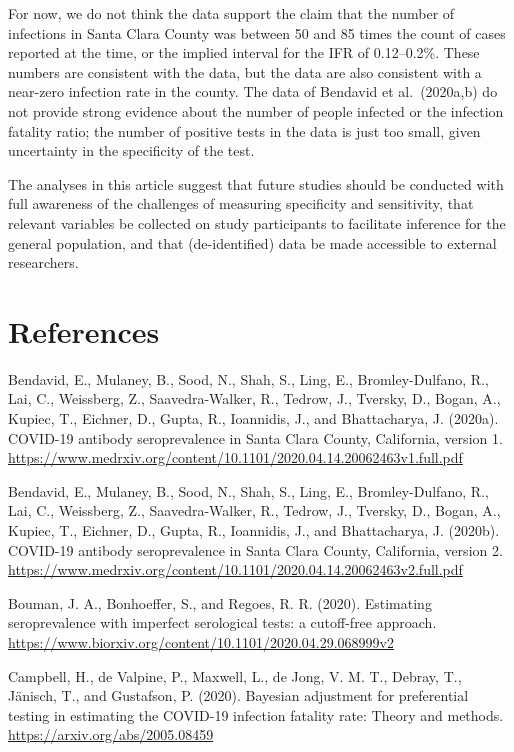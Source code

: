\documentclass[11pt]{article}
\begin{document}
For now, we do not think the data support the claim that the number of infections in Santa Clara County was between  50 and 85 times the count of cases reported at the time, or the implied interval for the IFR of 0.12--0.2\%.  These numbers are consistent with the data, but the data are also consistent with a near-zero infection rate in the county.  The data of Bendavid et al.\ (2020a,b) do not provide strong evidence about the number of people infected or the infection fatality ratio; the number of positive tests in the data is just too small, given uncertainty in the specificity of the test.

The analyses in this article suggest that future studies should be conducted with full awareness of the challenges of measuring specificity and sensitivity, that relevant variables be collected on study participants to facilitate inference for the general population, and that (de-identified) data be made accessible to external researchers.


\section*{References}

\noindent

\bibitem  Bendavid, E., Mulaney, B., Sood, N., Shah, S., Ling, E., Bromley-Dulfano, R., Lai, C.,  Weissberg, Z., Saavedra-Walker, R., Tedrow, J., Tversky, D., Bogan, A., Kupiec, T., Eichner, D., Gupta, R., Ioannidis, J., and Bhattacharya, J. (2020a).  COVID-19 antibody seroprevalence in Santa Clara County, California, version 1. {\small \url{https://www.medrxiv.org/content/10.1101/2020.04.14.20062463v1.full.pdf}}

\bibitem  Bendavid, E., Mulaney, B., Sood, N., Shah, S., Ling, E., Bromley-Dulfano, R., Lai, C.,  Weissberg, Z., Saavedra-Walker, R., Tedrow, J., Tversky, D., Bogan, A., Kupiec, T., Eichner, D., Gupta, R., Ioannidis, J., and Bhattacharya, J. (2020b).  COVID-19 antibody seroprevalence in Santa Clara County, California, version 2. {\small \url{https://www.medrxiv.org/content/10.1101/2020.04.14.20062463v2.full.pdf}}

\bibitem Bouman, J. A., Bonhoeffer, S., and Regoes, R. R.  (2020).  Estimating seroprevalence with imperfect serological tests: a cutoff-free approach.  {\small \url{https://www.biorxiv.org/content/10.1101/2020.04.29.068999v2}}

\bibitem Campbell, H., de Valpine, P., Maxwell, L., de Jong, V. M. T., Debray, T., Jänisch, T., and Gustafson, P. (2020).  Bayesian adjustment for preferential testing in estimating the COVID-19 infection fatality rate: Theory and methods.  {\small \url{https://arxiv.org/abs/2005.08459}}
\end{document}

